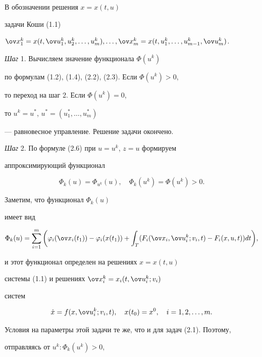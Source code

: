 В обозначении решения $x=x(t,u)$


задачи Коши (1.1) 


$\ov x_1^k=x(t,\ov u_1^k,u_2^k,\dotsc, u_m^k),


\dotsc ,\ov x_m^k=x(t,u_1^k,\dotsc ,u_{m-1}^{k},\ov u_m^k)$.





{\it Шаг} 1. Вычисляем значение функционала $\Phi(u^k)$


по формулам (1.2), (1.4), (2.2), (2.3). Если $\Phi(u^k)>0$,


то переход на шаг 2. Если $\Phi(u^k)=0$,


то $u^k=u^{\ast}$, $u^{\ast}=(u_1^{\ast},\dotsc, u_m^{\ast})$ 


--- равновесное управление. Решение задачи окончено.





{\it Шаг} 2. По формуле (2.6) при $u=u^k$, $z=u$ формируем 


аппроксимирующий функционал 


$$


\Phi_k(u)=\Phi_{{u^k}}(u),\quad \Phi_k(u^k)=\Phi(u^k)>0.


$$


Заметим, что функционал $\Phi_k(u)$


имеет вид


\begin{equation}


\Phi_k(u)=\sum_{i=1}^{m}\bigg(\varphi_i(\ov x_i(t_1))-


\varphi_i(x(t_1))+\int_{T}


(F_i(\ov x_i,\ov u_i^k;v_i,t)-F_i(x,u,t))dt\bigg),


\end{equation}


и этот функционал определен на решениях $x=x(t,u)$


системы (1.1) и решениях $\ov x_i^k=x_i(t,\ov u_i^k;v_i)$


систем


$$


\Dot x=f(x,\ov u_i^k;v_i,t),\quad


x(t_0)=x^0,\quad i=1,2,\dotsc, m.


$$


Условия на параметры этой задачи те же, что и для задач (2.1). Поэтому, 


отправляясь от $u^k:\Phi_k(u^k)>0$,


